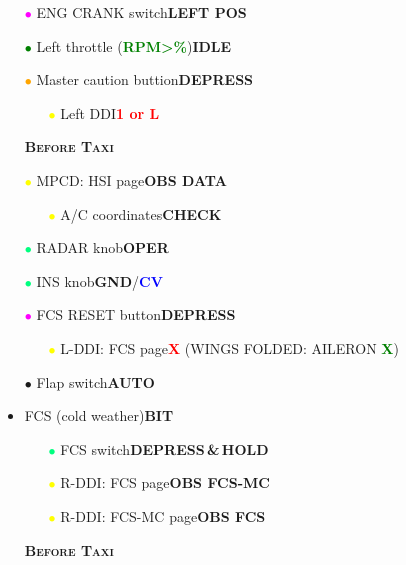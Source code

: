 \documentclass[a4paper,12pt,dvipsnames]{letter}
\newcommand{\button}[1]{\textbf{#1}}
\newcommand{\ok}[1]{\textcolor{Green}{\textbf{#1}}}
\newcommand{\boat}[1]{\textcolor{Blue}{\textbf{#1}}}
\newcommand{\warn}[1]{\textcolor{Red}{\textbf{#1}}}
\newcommand{\myHead}[1]{{\LARGE\textsc{\textbf{#1}}}}
\newcommand{\bi}{\textcolor{ProcessBlue}{$\bullet$\;}}
\newcommand{\gi}{\textcolor{Green}{$\bullet$\;}}
\newcommand{\yi}{\textcolor{Yellow}{$\bullet$\;}}
\newcommand{\mi}{\textcolor{Magenta}{$\bullet$\;}}
\newcommand{\oi}{\textcolor{Orange}{$\bullet$\;}}
\newcommand{\si}{\textcolor{SpringGreen}{$\bullet$\;}}
\begin{document}
{\begin{itemize}
 \item[\mi] ENG CRANK switch\dotfill\button{LEFT POS}
 \item[\gi] Left throttle (\ok{RPM\;>\%})\dotfill\button{IDLE}
 \item[\oi] Master caution buttion\dotfill\button{DEPRESS}
 \begin{itemize}
  \item[\yi] Left DDI\dotfill\warn{1 or L}
 \end{itemize} 
\end{itemize}
\vspace{0.5em}
\begin{itemize}
 \item[] \myHead{Before Taxi}
 \item[\yi] MPCD: HSI page\dotfill\button{OBS DATA}
 \begin{itemize}
  \item[\yi] A/C coordinates\dotfill\button{CHECK}
 \end{itemize} 
 \item[\si] RADAR knob\dotfill\button{OPER}
 \item[\si] INS knob\dotfill\button{GND}/\boat{CV}
 \item[\mi] FCS RESET button\dotfill\button{DEPRESS}
 \begin{itemize}
  \item[\yi] L-DDI: FCS page\dotfill\warn{X} (WINGS FOLDED: AILERON \ok{X})
 \end{itemize}
 \item[\bi] Flap switch\dotfill\button{AUTO}
 \item FCS (cold weather)\dotfill\button{BIT}
 \begin{itemize}
  \item[\si] FCS switch\dotfill\button{DEPRESS\,\&\,HOLD}
  \item[\yi] R-DDI: FCS page\dotfill\button{OBS FCS-MC}
  \item[\yi] R-DDI: FCS-MC page\dotfill\button{OBS FCS}
 \end{itemize}
\end{itemize} 
\newpage
\begin{itemize}
 \item[] \myHead{Before Taxi}

\end{itemize}}
\end{document}
